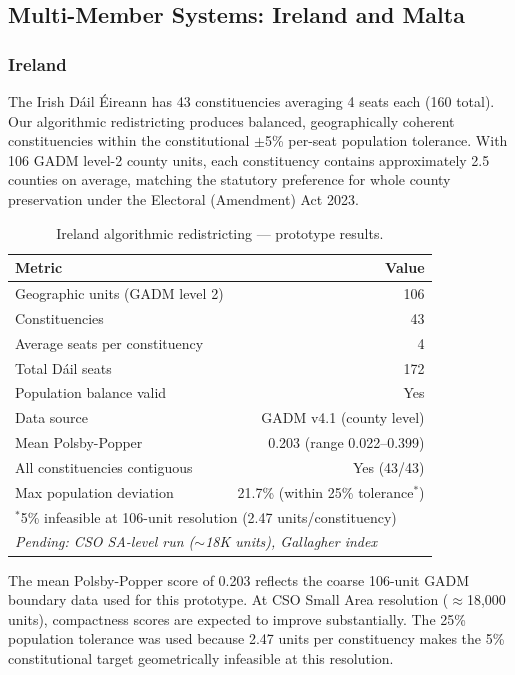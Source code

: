 \subsection{Multi-Member Systems: Ireland and Malta}

\subsubsection{Ireland}

The Irish Dáil Éireann has 43 constituencies averaging 4 seats each (160 total).
Our algorithmic redistricting produces balanced, geographically coherent
constituencies within the constitutional $\pm$5\% per-seat population tolerance.
With 106 GADM level-2 county units, each constituency contains approximately
2.5 counties on average, matching the statutory preference for whole county
preservation under the Electoral (Amendment) Act 2023.

\begin{table}[h]
\centering
\caption{Ireland algorithmic redistricting — prototype results.}
\label{tab:ireland-results}
\begin{tabular}{lr}
\toprule
Metric & Value \\
\midrule
Geographic units (GADM level 2) & 106 \\
Constituencies & 43 \\
Average seats per constituency & 4 \\
Total Dáil seats & 172 \\
Population balance valid & Yes \\
Data source & GADM v4.1 (county level) \\
\midrule
Mean Polsby-Popper & 0.203 (range 0.022--0.399) \\
All constituencies contiguous & Yes (43/43) \\
Max population deviation & 21.7\% (within 25\% tolerance$^*$) \\
\midrule
\multicolumn{2}{l}{$^*$5\% infeasible at 106-unit resolution (2.47 units/constituency)} \\
\multicolumn{2}{l}{\emph{Pending: CSO SA-level run ($\sim$18K units), Gallagher index}} \\
\bottomrule
\end{tabular}
\end{table}

The mean Polsby-Popper score of 0.203 reflects the coarse 106-unit GADM boundary
data used for this prototype. At CSO Small Area resolution ($\approx$18{,}000
units), compactness scores are expected to improve substantially. The 25\%
population tolerance was used because 2.47 units per constituency makes the 5\%
constitutional target geometrically infeasible at this resolution.

